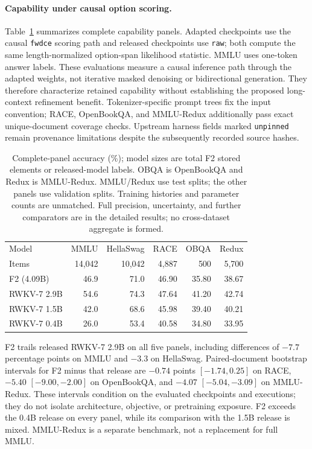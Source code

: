 \documentclass{article}
\theoremstyle{remark}\newtheorem{remark}[theorem]{Remark}
\begin{document}
\paragraph{Capability under causal option scoring.}
Table~\ref{tab:main-capability} summarizes complete capability panels. Adapted checkpoints
use the causal \texttt{fwdce} scoring path and released checkpoints use \texttt{raw};
both compute the same length-normalized option-span likelihood statistic. MMLU uses
one-token answer labels. These evaluations measure a causal inference path through the
adapted weights, not iterative masked denoising or bidirectional generation. They
therefore characterize retained capability without establishing the proposed
long-context refinement benefit. Tokenizer-specific prompt trees fix the input
convention; RACE, OpenBookQA, and MMLU-Redux additionally pass exact unique-document
coverage checks. Upstream harness fields marked \texttt{unpinned} remain provenance
limitations despite the subsequently recorded source hashes.

\begin{table}[t]
\centering\small
\setlength{\tabcolsep}{4pt}
\begin{tabular}{@{}lrrrrr@{}}
\toprule
Model & MMLU & HellaSwag & RACE & OBQA & Redux\\
Items & 14,042 & 10,042 & 4,887 & 500 & 5,700\\
\midrule
F2 (4.09B) & 46.9 & 71.0 & 46.90 & 35.80 & 38.67\\
RWKV-7 2.9B & 54.6 & 74.3 & 47.64 & 41.20 & 42.74\\
RWKV-7 1.5B & 42.0 & 68.6 & 45.98 & 39.40 & 40.21\\
RWKV-7 0.4B & 26.0 & 53.4 & 40.58 & 34.80 & 33.95\\
\bottomrule
\end{tabular}
\caption{Complete-panel accuracy (\%); model sizes are total F2 stored elements or
released-model labels. OBQA is OpenBookQA and Redux is MMLU-Redux. MMLU/Redux use test
splits; the other panels use validation splits. Training histories and parameter counts
are unmatched. Full precision, uncertainty, and further comparators are in the detailed
results; no cross-dataset aggregate is formed.}
\label{tab:main-capability}
\end{table}

F2 trails released RWKV-7 2.9B on all five panels, including differences of
$-7.7$ percentage points on MMLU and $-3.3$ on HellaSwag. Paired-document bootstrap
intervals for F2 minus that release are $-0.74$ points $[-1.74,0.25]$ on RACE,
$-5.40$ $[-9.00,-2.00]$ on OpenBookQA, and $-4.07$ $[-5.04,-3.09]$ on
MMLU-Redux. These intervals condition on the evaluated checkpoints and executions;
they do not isolate architecture, objective, or pretraining exposure. F2 exceeds the
0.4B release on every panel, while its comparison with the 1.5B release is mixed.
MMLU-Redux is a separate benchmark, not a replacement for full MMLU.
\end{document}
